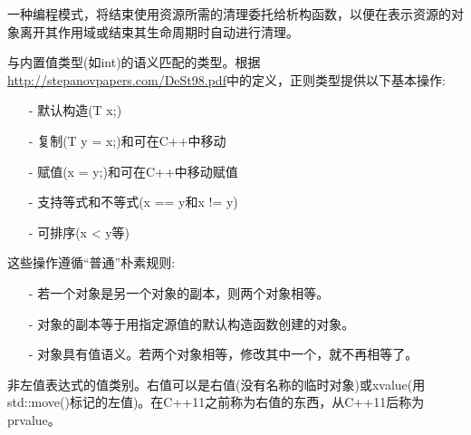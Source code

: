 



一种编程模式，将结束使用资源所需的清理委托给析构函数，以便在表示资源的对象离开其作用域或结束其生命周期时自动进行清理。



与内置值类型(如int)的语义匹配的类型。根据\url{http://stepanovpapers.com/DeSt98.pdf}中的定义，正则类型提供以下基本操作:

\begin{itemize}
\item [-]
默认构造(T x;)

\item [-]
复制(T y = x;)和可在C++中移动

\item [-]
赋值(x = y;)和可在C++中移动赋值

\item [-]
支持等式和不等式(x == y和x != y)

\item [-]
可排序(x < y等)
\end{itemize}

这些操作遵循“普通”朴素规则:

\begin{itemize}
\item [-]
若一个对象是另一个对象的副本，则两个对象相等。

\item [-]
对象的副本等于用指定源值的默认构造函数创建的对象。

\item [-]
对象具有值语义。若两个对象相等，修改其中一个，就不再相等了。
\end{itemize}


非左值表达式的值类别。右值可以是右值(没有名称的临时对象)或xvalue(用std::move()标记的左值)。在C++11之前称为右值的东西，从C++11后称为prvalue。

















